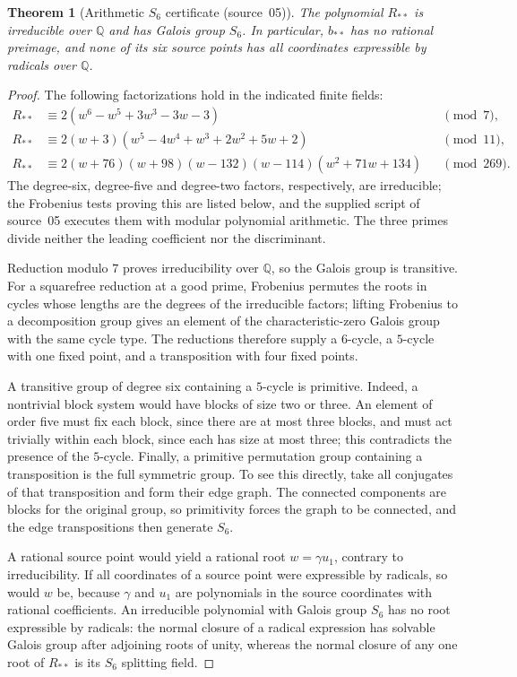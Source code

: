 \documentclass[11pt,a4paper]{article}
\newtheorem{theorem}{Theorem}[section]
\theoremstyle{definition}
\newcommand{\Q}{\mathbb Q}
\newcommand{\src}[1]{\textup{(source~#1)}}
\begin{document}
\begin{theorem}[Arithmetic $S_6$ certificate \src{05}]
\label{f6:kf:prop:arithmetic}
The polynomial $R_{**}$ is irreducible over $\Q$ and has Galois group $S_6$.
In particular, $b_{**}$ has no rational preimage, and none of its six source
points has all coordinates expressible by radicals over $\Q$.
\end{theorem}
\begin{proof}
The following factorizations hold in the indicated finite fields:
\begin{align}
R_{**}&\equiv2(w^6-w^5+3w^3-3w-3)&&\pmod7,\label{f6:kf:eq:mod7}\\
R_{**}&\equiv2(w+3)(w^5-4w^4+w^3+2w^2+5w+2)&&\pmod{11},\label{f6:kf:eq:mod11}\\
R_{**}&\equiv2(w+76)(w+98)(w-132)(w-114)(w^2+71w+134)&&\pmod{269}.
\label{f6:kf:eq:mod269}
\end{align}
The degree-six, degree-five and degree-two factors, respectively, are
irreducible; the Frobenius tests proving this are listed below, and the
supplied script of source~05 executes them with modular polynomial
arithmetic. The three primes divide neither the leading coefficient nor the
discriminant.

Reduction modulo $7$ proves irreducibility over $\Q$, so the Galois group is
transitive. For a squarefree reduction at a good prime, Frobenius permutes
the roots in cycles whose lengths are the degrees of the irreducible factors;
lifting Frobenius to a decomposition group gives an element of the
characteristic-zero Galois group with the same cycle type. The reductions
therefore supply a $6$-cycle, a $5$-cycle with one fixed point, and a
transposition with four fixed points.

A transitive group of degree six containing a $5$-cycle is primitive. Indeed,
a nontrivial block system would have blocks of size two or three. An element
of order five must fix each block, since there are at most three blocks, and
must act trivially within each block, since each has size at most three;
this contradicts the presence of the $5$-cycle. Finally, a primitive
permutation group containing a transposition is the full symmetric group. To
see this directly, take all conjugates of that transposition and form their
edge graph. The connected components are blocks for the original group, so
primitivity forces the graph to be connected, and the edge transpositions
then generate $S_6$.

A rational source point would yield a rational root $w=\gamma u_1$, contrary
to irreducibility. If all coordinates of a source point were expressible by
radicals, so would $w$ be, because $\gamma$ and $u_1$ are polynomials in the
source coordinates with rational coefficients. An irreducible polynomial with
Galois group $S_6$ has no root expressible by radicals: the normal closure of
a radical expression has solvable Galois group after adjoining roots of unity,
whereas the normal closure of any one root of $R_{**}$ is its $S_6$ splitting
field.
\end{proof}
\end{document}
